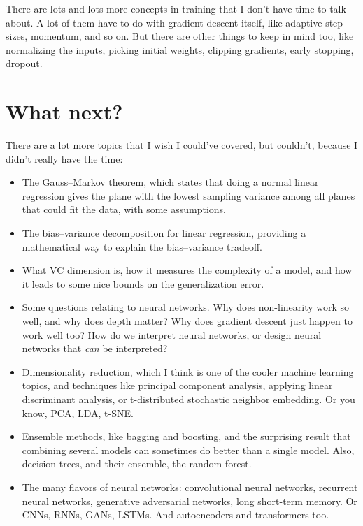 \documentclass[11pt,paper=letter]{scrartcl}
\begin{document}
There are lots and lots more concepts in training that I don't have time to talk about. A lot of them have to do with gradient descent itself, like adaptive step sizes, momentum, and so on. But there are other things to keep in mind too, like normalizing the inputs, picking initial weights, clipping gradients, early stopping, dropout.

\clearpage

\section{What next?}

There are a lot more topics that I wish I could've covered, but couldn't, because I didn't really have the time:

\begin{itemize}
  \item The Gauss--Markov theorem, which states that doing a normal linear regression gives the plane with the lowest sampling variance among all planes that could fit the data, with some assumptions.

  \item The bias--variance decomposition for linear regression, providing a mathematical way to explain the bias--variance tradeoff.

  \item What VC dimension is, how it measures the complexity of a model, and how it leads to some nice bounds on the generalization error.

  \item Some questions relating to neural networks. Why does non-linearity work so well, and why does depth matter? Why does gradient descent just happen to work well too? How do we interpret neural networks, or design neural networks that \textit{can} be interpreted?

  \item Dimensionality reduction, which I think is one of the cooler machine learning topics, and techniques like principal component analysis, applying linear discriminant analysis, or t-distributed stochastic neighbor embedding. Or you know, PCA, LDA, t-SNE.

  \item Ensemble methods, like bagging and boosting, and the surprising result that combining several models can sometimes do better than a single model. Also, decision trees, and their ensemble, the random forest.

  \item The many flavors of neural networks: convolutional neural networks, recurrent neural networks, generative adversarial networks, long short-term memory. Or CNNs, RNNs, GANs, LSTMs. And autoencoders and transformers too.


\end{itemize}
\end{document}
